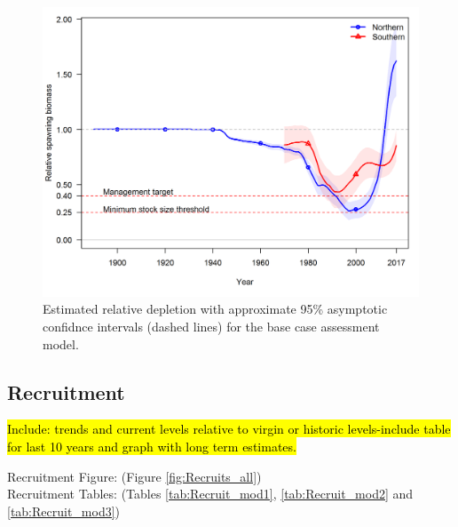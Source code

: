 \documentclass[12pt,]{article}
\begin{document}
\begin{figure}[htbp]
\centering
\includegraphics{r4ss/plots_compare/base_compare4_Bratio_uncertainty.png}
\caption{Estimated relative depletion with approximate 95\% asymptotic
confidnce intervals (dashed lines) for the base case assessment model.
\label{fig:RelDeplete_all}}
\end{figure}

\FloatBarrier

\subsection*{Recruitment}\label{recruitment}

\hl{Include: trends and current levels relative to virgin or historic levels-include 
table for last 10 years and graph with long term estimates.}

Recruitment Figure: (Figure \ref{fig:Recruits_all})\\
Recruitment Tables: (Tables \ref{tab:Recruit_mod1},
\ref{tab:Recruit_mod2} and \ref{tab:Recruit_mod3})
\end{document}
